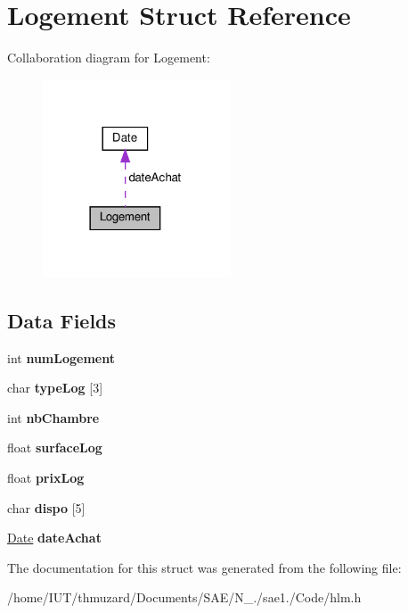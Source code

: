 \hypertarget{struct_logement}{}\section{Logement Struct Reference}
\label{struct_logement}


Collaboration diagram for Logement\+:
\nopagebreak
\begin{figure}[H]
\begin{center}
\leavevmode
\includegraphics[width=158pt]{struct_logement__coll__graph}
\end{center}
\end{figure}
\subsection*{Data Fields}
\begin{DoxyCompactItemize}
\item 
\mbox{\label{struct_logement_ad8bc1cf03e6bd5d3a06df1de9830ef88}} 
int {\bfseries num\+Logement}
\item 
\mbox{\label{struct_logement_a03c7718814cc87682a5d2dfce7b287d7}} 
char {\bfseries type\+Log} \mbox{[}3\mbox{]}
\item 
\mbox{\label{struct_logement_a5e44ddbcd31c92ef9fbc26c68cbdd85b}} 
int {\bfseries nb\+Chambre}
\item 
\mbox{\label{struct_logement_a669a792fad91b1d30d5abf3d0daf099a}} 
float {\bfseries surface\+Log}
\item 
\mbox{\label{struct_logement_ad4bbf90506e48b5c4701d68ae5420238}} 
float {\bfseries prix\+Log}
\item 
\mbox{\label{struct_logement_a53fba463f9f34aa7d8da0d0ea71fd5fe}} 
char {\bfseries dispo} \mbox{[}5\mbox{]}
\item 
\mbox{\label{struct_logement_a530275c4532dc6044a2a1d4ddb835de3}} 
\hyperlink{struct_date}{Date} {\bfseries date\+Achat}
\end{DoxyCompactItemize}


The documentation for this struct was generated from the following file\+:\begin{DoxyCompactItemize}
\item 
/home/\+I\+U\+T/thmuzard/\+Documents/\+S\+A\+E/\+N\+\_./sae1./\+Code/hlm.\+h\end{DoxyCompactItemize}
